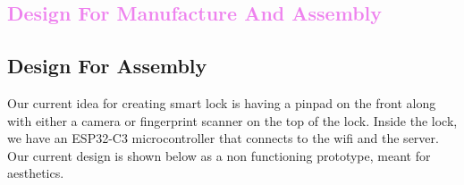 \textcolor{violet}{\section{Design For Manufacture And Assembly}}

\subsection{Design For Assembly}

Our current idea for creating smart lock is having a pinpad on the front along with either a camera or fingerprint scanner on the top of the lock. Inside the lock, we have an ESP32-C3 microcontroller that connects to the wifi and the server. Our current design is shown below as a non functioning prototype, meant for aesthetics.

